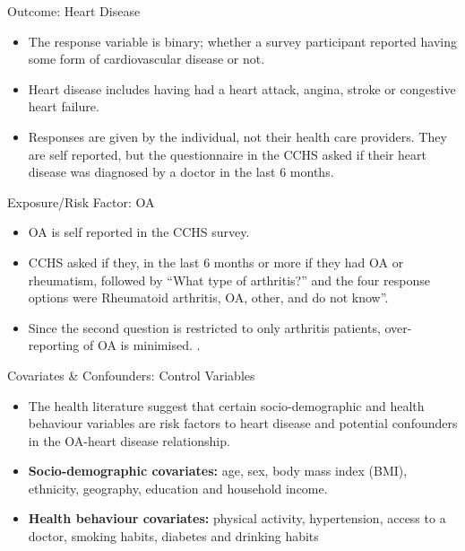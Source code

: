 \begin{frame}{Outcome: Heart Disease}
\begin{itemize}
    \item The response variable is binary; whether a survey participant reported having some form of cardiovascular disease or not. 
    \item Heart disease includes having had a heart attack, angina, stroke or congestive heart failure.
    \item Responses are given by the individual, not their health care providers. They are self reported, but the questionnaire in the CCHS asked if their heart disease was diagnosed by a doctor in the last 6 months. 
\end{itemize}
\end{frame}

\begin{frame}{Exposure/Risk Factor: OA}
\begin{itemize}
    \item OA is self reported in the CCHS survey.
    \item CCHS asked if they, in the last 6 months or more if they had OA or rheumatism, followed by “What type of arthritis?” and the four response
options were Rheumatoid arthritis, OA, other, and do
not know”.
    \item Since the second question is restricted to
only arthritis patients, over-reporting of OA is minimised. \cite{rahman2013relationship}.
\end{itemize}

\end{frame}

\begin{frame}{Covariates \& Confounders: Control Variables}
\begin{itemize}
    \item The health literature suggest that  certain socio-demographic and health behaviour variables are risk factors to heart disease and potential confounders in the OA-heart disease relationship.
    \item \textbf{Socio-demographic covariates:} age, sex, body mass index (BMI), ethnicity, geography, education and household income.
    \item \textbf{Health behaviour covariates: }physical activity, hypertension, access to a doctor, smoking habits, diabetes and drinking habits
\end{itemize}
\end{frame}

